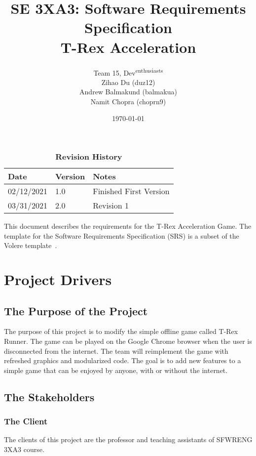 \documentclass[12pt, titlepage]{article}
\title{SE 3XA3: Software Requirements Specification\\T-Rex Acceleration}
\author{Team 15, Dev\textsuperscript{enthusiasts}
		\\ Zihao Du (duz12)
		\\ Andrew Balmakund (balmakua) 
		\\ Namit Chopra (choprn9)
}
\date{\today}
\begin{document}
\maketitle

\tableofcontents
\listoftables
\listoffigures

\begin{table}[bp]
\caption{\bf Revision History}
\begin{tabularx}{\textwidth}{p{3cm}p{2cm}X}
\toprule {\bf Date} & {\bf Version} & {\bf Notes}\\
\midrule
02/12/2021 & 1.0 & Finished First Version\\
03/31/2021 & 2.0 & Revision 1\\
\bottomrule
\end{tabularx}
\end{table}

\newpage


This document describes the requirements for the T-Rex Acceleration Game. The template for the Software
Requirements Specification (SRS) is a subset of the Volere template~\citep{RobertsonAndRobertson2012}. 

\section{Project Drivers}

\subsection{The Purpose of the Project}
The purpose of this project is to modify the simple offline game called T-Rex Runner. The game can be played on the Google Chrome browser when the user is disconnected from the internet. The team will reimplement the game with refreshed graphics and modularized code. The goal is to add new features to a simple game that can be enjoyed by anyone, with or without the internet. 

\subsection{The Stakeholders}

\subsubsection{The Client}
The clients of this project are the professor and teaching assistants of SFWRENG 3XA3 course.
\end{document}
